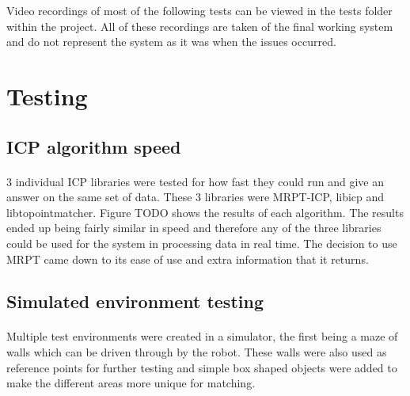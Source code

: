 Video recordings of most of the following tests can be viewed in the tests folder within the project. All of these recordings are taken of the final working system and do not represent the system as it was when the issues occurred.


\section{Testing}
\subsection{ICP algorithm speed}
\paragraph{}
3 individual ICP libraries were tested for how fast they could run and give an answer on the same set of data. These 3 libraries were MRPT-ICP, libicp and libtopointmatcher. Figure TODO shows the results of each algorithm. The results ended up being fairly similar in speed and therefore any of the three libraries could be used for the system in processing data in real time. The decision to use MRPT came down to its ease of use and extra information that it returns.

\subsection{Simulated environment testing}
\paragraph{}
Multiple test environments were created in a simulator, the first being a maze of walls which can be driven through by the robot. These walls were also used as reference points for further testing and simple box shaped objects were added to make the different areas more unique for matching.

